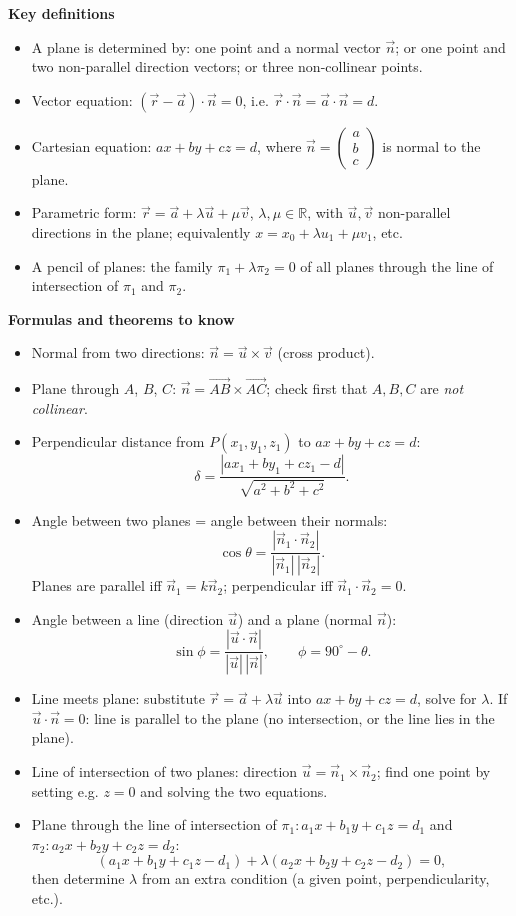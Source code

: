 \documentclass[11pt]{article}
\newcommand{\cle}[1]{{\popxbold\color{popdark}#1}}
\begin{document}
\begin{bilan}
\textbf{Key definitions}
\begin{itemize}
\item A \cle{plane} is determined by: one point and a \cle{normal vector} $\vec{n}$; or one point and two non-parallel direction vectors; or three non-collinear points.
\item \cle{Vector equation}: $(\vec{r}-\vec{a})\cdot\vec{n}=0$, i.e. $\vec{r}\cdot\vec{n}=\vec{a}\cdot\vec{n}=d$.
\item \cle{Cartesian equation}: $ax+by+cz=d$, where $\vec{n}=\begin{pmatrix}a\\b\\c\end{pmatrix}$ is normal to the plane.
\item \cle{Parametric form}: $\vec{r}=\vec{a}+\lambda\vec{u}+\mu\vec{v}$, $\lambda,\mu\in\mathbb{R}$, with $\vec{u},\vec{v}$ non-parallel directions in the plane; equivalently $x=x_0+\lambda u_1+\mu v_1$, etc.
\item A \cle{pencil of planes}: the family $\pi_1+\lambda\pi_2=0$ of all planes through the line of intersection of $\pi_1$ and $\pi_2$.
\end{itemize}

\textbf{Formulas and theorems to know}
\begin{itemize}
\item Normal from two directions: $\vec{n}=\vec{u}\times\vec{v}$ (cross product).
\item Plane through $A$, $B$, $C$: $\vec{n}=\overrightarrow{AB}\times\overrightarrow{AC}$; check first that $A,B,C$ are \emph{not collinear}.
\item \cle{Perpendicular distance} from $P(x_1,y_1,z_1)$ to $ax+by+cz=d$:
\[ \delta=\frac{|ax_1+by_1+cz_1-d|}{\sqrt{a^2+b^2+c^2}}. \]
\item \cle{Angle between two planes} = angle between their normals:
\[ \cos\theta=\frac{|\vec{n}_1\cdot\vec{n}_2|}{|\vec{n}_1|\,|\vec{n}_2|}. \]
Planes are parallel iff $\vec{n}_1=k\vec{n}_2$; perpendicular iff $\vec{n}_1\cdot\vec{n}_2=0$.
\item \cle{Angle between a line} (direction $\vec{u}$) \cle{and a plane} (normal $\vec{n}$):
\[ \sin\phi=\frac{|\vec{u}\cdot\vec{n}|}{|\vec{u}|\,|\vec{n}|}, \qquad \phi=90^\circ-\theta. \]
\item Line meets plane: substitute $\vec{r}=\vec{a}+\lambda\vec{u}$ into $ax+by+cz=d$, solve for $\lambda$. If $\vec{u}\cdot\vec{n}=0$: line is parallel to the plane (no intersection, or the line lies in the plane).
\item Line of intersection of two planes: direction $\vec{u}=\vec{n}_1\times\vec{n}_2$; find one point by setting e.g. $z=0$ and solving the two equations.
\item Plane through the line of intersection of $\pi_1: a_1x+b_1y+c_1z=d_1$ and $\pi_2: a_2x+b_2y+c_2z=d_2$:
\[ (a_1x+b_1y+c_1z-d_1)+\lambda(a_2x+b_2y+c_2z-d_2)=0, \]
then determine $\lambda$ from an extra condition (a given point, perpendicularity, etc.).
\end{itemize}


\end{bilan}
\end{document}
